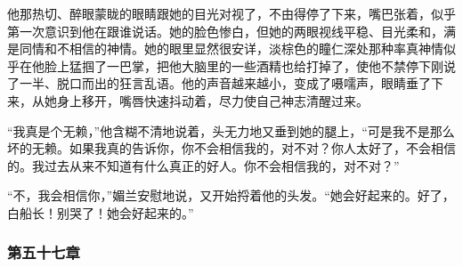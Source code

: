 \par 他那热切、醉眼蒙眬的眼睛跟她的目光对视了，不由得停了下来，嘴巴张着，似乎第一次意识到他在跟谁说话。她的脸色惨白，但她的两眼视线平稳、目光柔和，满是同情和不相信的神情。她的眼里显然很安详，淡棕色的瞳仁深处那种率真神情似乎在他脸上猛掴了一巴掌，把他大脑里的一些酒精也给打掉了，使他不禁停下刚说了一半、脱口而出的狂言乱语。他的声音越来越小，变成了嗫嚅声，眼睛垂了下来，从她身上移开，嘴唇快速抖动着，尽力使自己神志清醒过来。
\par “我真是个无赖，”他含糊不清地说着，头无力地又垂到她的腿上，“可是我不是那么坏的无赖。如果我真的告诉你，你不会相信我的，对不对？你人太好了，不会相信的。我过去从来不知道有什么真正的好人。你不会相信我的，对不对？”
\par “不，我会相信你，”媚兰安慰地说，又开始捋着他的头发。“她会好起来的。好了，白船长！别哭了！她会好起来的。”

\subsubsection{第五十七章}

